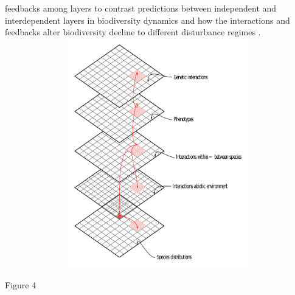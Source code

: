 \documentclass[11pt]{article}
\begin{document}
\begin{mybox}
\begin{singlespace}
\begin{small}
  feedbacks among layers to contrast predictions between independent
  and interdependent layers in biodiversity dynamics and how the
  interactions and feedbacks alter biodiversity decline to different
  disturbance regimes \citep{Melianetal:2018}. \vspace{-3 in}
  \hspace{0.5 in}\includegraphics[width=14cm,height=10cm]{Box2b.pdf}\\
  \vspace{2 in} \hspace{0.1 in} \caption{{\small Figure 4}}
  \vspace{0.75 in}
\end{small}
\end{singlespace}
\end{mybox}
\end{document}

